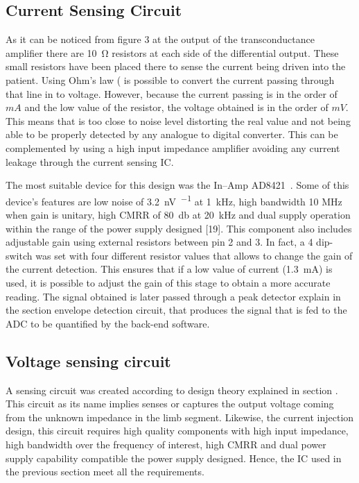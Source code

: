 \subsection{Current Sensing Circuit}
As it can be noticed from figure 3 at the output of the transconductance amplifier there are \SI{10}{\ohm} resistors at each side of the differential output. These small resistors have been placed there to sense the current being driven into the patient. Using Ohm's law ( is possible to convert the current passing through that line in to voltage. However, because the current passing is in the order of $mA$ and the low value of the resistor, the voltage obtained is in the order of $mV$. This means that is too close to noise level distorting the real value and not being able to be properly detected by any analogue to digital converter. This can be complemented by using a high input impedance amplifier avoiding any current leakage through the current sensing IC.  

The most suitable device for this design was the In–Amp AD8421~\cite{ad:AD8421}. Some of this device's features are low noise of \SI{3.2}{\nano\volt\per{}} at \SI{1}{\kHz}, high bandwidth 10 MHz when gain is unitary, high CMRR of \SI{80}{\decibel} at \SI{20}{\kHz} and dual supply operation within the range of the power supply designed [19]. This component also includes adjustable gain using external resistors between pin 2 and 3. In fact, a 4 dip-switch was set with four different resistor values that allows to change the gain of the current detection. This ensures that if a low value of current (\SI{1.3}{\mA}) is used, it is possible to adjust the gain of this stage to obtain a more accurate reading. The signal obtained is later passed through a peak detector explain in the section envelope detection circuit, that produces the signal that is fed to the ADC to be quantified by the back-end software. 

\subsection{Voltage sensing circuit}
A sensing circuit was created according to design theory explained in section . This circuit as its name implies senses or captures the output voltage coming from the unknown impedance in the limb segment. Likewise, the current injection design, this circuit requires high quality components with high input impedance, high bandwidth over the frequency of interest, high CMRR and dual power supply capability compatible the power supply designed. Hence, the IC used in the previous section meet all the requirements. 

